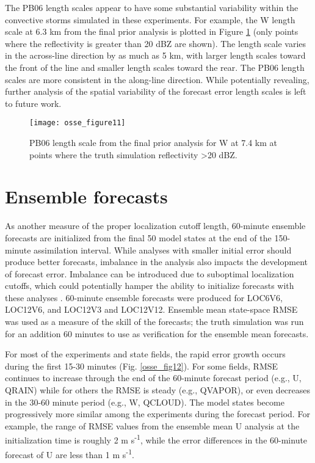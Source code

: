 The PB06 length scales appear to have some substantial variability within the convective storms simulated in these experiments. For example, the W length scale at 6.3 km from the final prior analysis is plotted in Figure \ref{osse_fig11} (only points where the reflectivity is greater than 20 dBZ are shown). The length scale varies in the across-line direction by as much as 5 km, with larger length scales toward the front of the line and smaller length scales toward the rear. The PB06 length scales are more consistent in the along-line direction. While potentially revealing, further analysis of the spatial variability of the forecast error length scales is left to future work.

\begin{figure}
\centering
\texttt{[image: osse\_figure11]}
\caption{PB06 length scale from the final prior analysis for W at 7.4 km at points where the truth simulation reflectivity \textgreater 20 dBZ.}
\label{osse_fig11}
\end{figure}

\section{Ensemble forecasts}
As another measure of the proper localization cutoff length, 60-minute ensemble forecasts are initialized from the final 50 model states at the end of the 150-minute assimilation interval. While analyses with smaller initial error should produce better forecasts, imbalance in the analysis also impacts the development of forecast error. Imbalance can be introduced due to suboptimal localization cutoffs, which could potentially hamper the ability to initialize forecasts with these analyses \citep{greybushetal11}. 60-minute ensemble forecasts were produced for LOC6V6, LOC12V6, and LOC12V3 and LOC12V12. Ensemble mean state-space RMSE was used as a measure of the skill of the forecasts; the truth simulation was run for an addition 60 minutes to use as verification for the ensemble mean forecasts. 

For most of the experiments and state fields, the rapid error growth occurs during the first 15-30 minutes (Fig. \ref{osse_fig12}). For some fields, RMSE continues to increase through the end of the 60-minute forecast period (e.g., U, QRAIN) while for others the RMSE is steady (e.g., QVAPOR), or even decreases in the 30-60 minute period (e.g., W, QCLOUD). The model states become progressively more similar among the experiments during the forecast period. For example, the range of RMSE values from the ensemble mean U analysis at the initialization time is roughly 2 m s\textsuperscript{-1}, while the error differences in the 60-minute forecast of U are less than 1 m s\textsuperscript{-1}.

